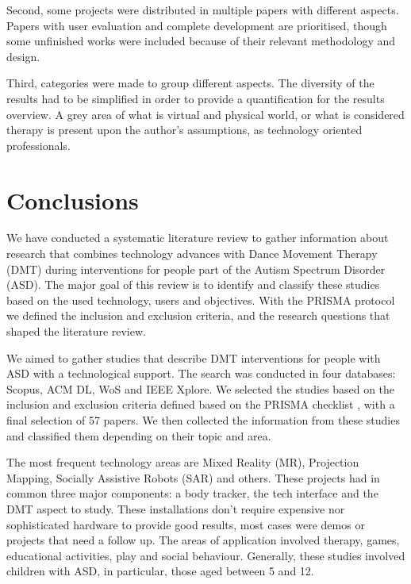 \documentclass[a4paper,fleqn]{cas-sc}
\begin{document}
Second, some projects were distributed in multiple papers with different aspects. Papers with user evaluation and complete development are prioritised, though some unfinished works were included because of their relevant methodology and design.

Third, categories were made to group different aspects. The diversity of the results had to be simplified in order to provide a quantification for the results overview. A grey area of what is virtual and physical world, or what is considered therapy is present upon the author's assumptions, as technology oriented professionals.


\section{Conclusions}
\label{sec6:conclusion}
We have conducted a systematic literature review to gather information about research that combines technology advances with Dance Movement Therapy (DMT) during interventions for people part of the Autism Spectrum Disorder (ASD). The major goal of this review is to identify and classify these studies based on the used technology, users and objectives. With the PRISMA protocol we defined the inclusion and exclusion criteria, and the  research questions that shaped the literature review.

We aimed to gather studies that describe DMT interventions for people with ASD with a technological support. The search was conducted in four databases: Scopus, ACM DL, WoS and IEEE Xplore. We selected the studies based on the inclusion and exclusion criteria defined based on the PRISMA checklist \cite{Pagen71}, with a final selection of 57 papers. We then collected the information from these studies and classified them depending on their topic and area.

The most frequent technology areas are Mixed Reality (MR), Projection Mapping, Socially Assistive Robots (SAR) and others. These projects had in common three major components: a body tracker, the tech interface and the DMT aspect to study. These installations don't require expensive nor sophisticated hardware to provide good results, most cases were demos or projects that need a follow up. The areas of application involved therapy, games, educational activities, play and social behaviour. Generally, these studies involved children with ASD, in particular, those aged between 5 and 12.
\end{document}
